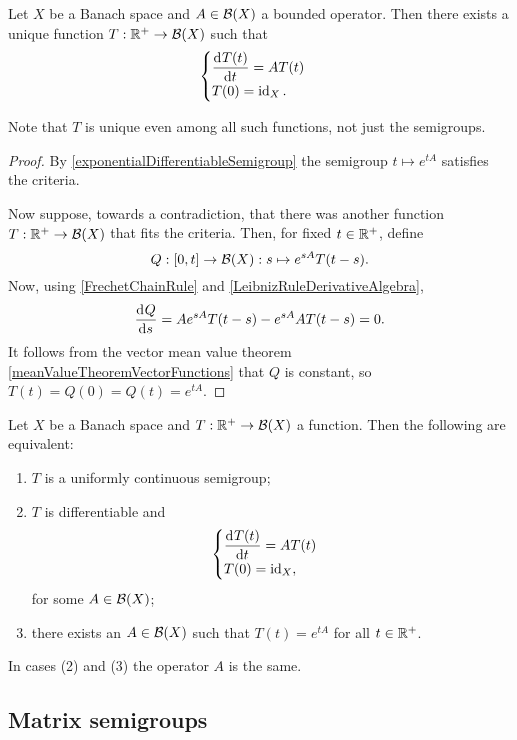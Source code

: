 \begin{proposition}
Let $X$ be a Banach space and $A\in \operatorname{\mathcal{B}}(X)$ a bounded operator. Then there exists a unique function $T: \mathbb{R}^+\to \operatorname{\mathcal{B}}(X)$ such that
\[ \begin{cases}
\mathinner{ \dfrac{\operatorname{d \!}{^{}}T(t)}{\operatorname{d \!}{{t}^{}}} } = AT(t) \\
T(0) = \operatorname{id}_X.
\end{cases} \]
\end{proposition}
Note that $T$ is unique even among all such functions, not just the semigroups.
\begin{proof}
By \ref{exponentialDifferentiableSemigroup} the semigroup $t\mapsto e^{tA}$ satisfies the criteria.

Now suppose, towards a contradiction, that there was another function $T: \mathbb{R}^+ \to \operatorname{\mathcal{B}}(X)$ that fits the criteria. Then, for fixed $t\in \mathbb{R}^+$, define
\[ Q: \interval{0,t}\to \Bounded(X): s\mapsto e^{sA}T(t-s). \]
Now, using \ref{FrechetChainRule} and \ref{LeibnizRuleDerivativeAlgebra},
\[ \mathinner{ \dfrac{\operatorname{d \!}{^{}}Q}{\operatorname{d \!}{{s}^{}}} } = Ae^{sA}T(t-s) - e^{sA}AT(t-s) = 0. \]
It follows from the vector mean value theorem \ref{meanValueTheoremVectorFunctions} that $Q$ is constant, so $T(t) = Q(0) = Q(t) = e^{tA}$.
\end{proof}


\begin{corollary}
Let $X$ be a Banach space and $T: \mathbb{R}^+\to \operatorname{\mathcal{B}}(X)$ a function.
Then the following are equivalent:
\begin{enumerate}
\item $T$ is a uniformly continuous semigroup;
\item $T$ is differentiable and
\[ \begin{cases}
\mathinner{ \dfrac{\operatorname{d \!}{^{}}T(t)}{\operatorname{d \!}{{t}^{}}} } = AT(t) \\
T(0) = \operatorname{id}_X,
\end{cases} \]
for some $A\in \operatorname{\mathcal{B}}(X)$;
\item there exists an $A\in \operatorname{\mathcal{B}}(X)$ such that $T(t) = e^{tA}$ for all $t\in \mathbb{R}^+$.
\end{enumerate}
\end{corollary}
In cases (2) and (3) the operator $A$ is the same.



\subsection{Matrix semigroups}
